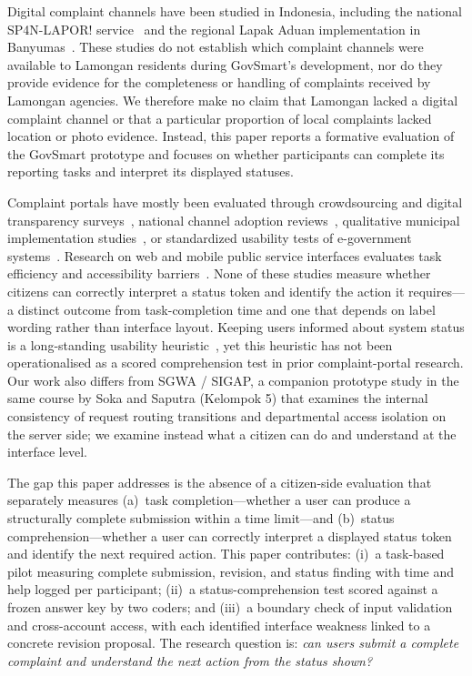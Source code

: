 \documentclass[11pt, runningheads, a4paper]{llncs}
\newcommand{\rev}[1]{#1}
\begin{document}
\rev{Digital complaint channels have been studied in Indonesia, including the
national SP4N-LAPOR! service~\cite{muttaqin2023} and the regional Lapak Aduan
implementation in Banyumas~\cite{indrayani2025}. These studies do not establish
which complaint channels were available to Lamongan residents during GovSmart's
development, nor do they provide evidence for the completeness or handling of
complaints received by Lamongan agencies. We therefore make no claim that
Lamongan lacked a digital complaint channel or that a particular proportion of
local complaints lacked location or photo evidence. Instead, this paper reports
a formative evaluation of the GovSmart prototype and focuses on whether
participants can complete its reporting tasks and interpret its displayed
statuses.}

Complaint portals have mostly been evaluated through crowdsourcing and digital transparency
surveys~\cite{zhao2023}, national channel adoption reviews~\cite{muttaqin2023}, qualitative
municipal implementation studies~\cite{indrayani2025}, or standardized usability tests of
e-government systems~\cite{rafifing2022}. Research on web and mobile public service interfaces
evaluates task efficiency and accessibility barriers~\cite{alsakran2021}. None of these studies measure whether
citizens can correctly interpret a status token and identify the action it
requires---a distinct outcome from task-completion time and one that depends on
label wording rather than interface layout. Keeping users informed about system
status is a long-standing usability heuristic~\cite{nielsen1994}, yet this
heuristic has not been operationalised as a scored comprehension test in prior
complaint-portal research. Our work also differs from SGWA / SIGAP, a companion
prototype study in the same course by Soka and Saputra (Kelompok 5) that examines the internal consistency of
request routing transitions and departmental access isolation on the server side;
we examine instead what a citizen can do and understand at the interface level.

The gap this paper addresses is the absence of a citizen-side evaluation that
separately measures (a)~task completion---whether a user can produce a
structurally complete submission within a time limit---and (b)~status
comprehension---whether a user can correctly interpret a displayed status token
and identify the next required action. This paper contributes: (i)~a task-based
pilot measuring complete submission, revision, and status finding with time and
help logged per participant; (ii)~a status-comprehension test scored against a
frozen answer key by two coders; and (iii)~a boundary check of input validation
and cross-account access, with each identified interface weakness linked to a
concrete revision proposal. The research question is: \emph{can users submit a
complete complaint and understand the next action from the status shown?}
\end{document}
